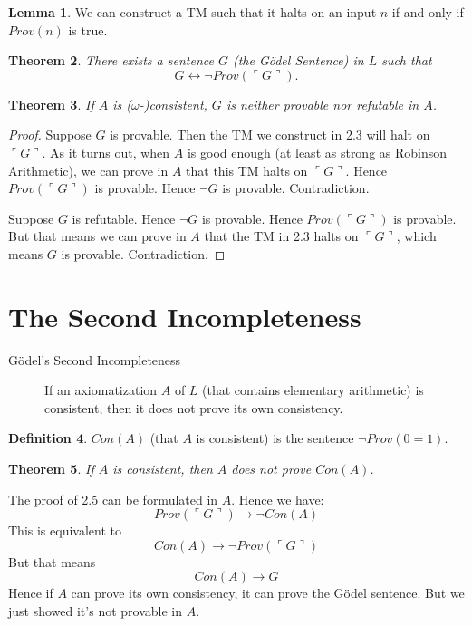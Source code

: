 \documentclass[12pt]{article}
\newtheorem{theo}{Theorem}[section]
\theoremstyle{definition}
\newtheorem{defin}[theo]{Definition}
\newtheorem{lema}[theo]{Lemma}
\newcommand{\proofsketch}{\vspace*{-1ex} \noindent {\bf Proof Sketch: }}
\begin{document}
\begin{lema} 
We can construct a TM such that it halts on an input $n$ if and only if $Prov(n)$ is true.
\end{lema}

\begin{theo}
There exists a sentence $G$ (the G\"{o}del Sentence) in $L$ such that
$$G \leftrightarrow \neg Prov(\ulcorner G \urcorner).$$
\end{theo}

\begin{theo}
If $A$ is ($\omega$-)consistent, $G$ is neither provable nor refutable in $A$.
\end{theo}

\begin{proof} 
Suppose $G$ is provable. Then the TM we construct in 2.3 will halt on $\ulcorner G \urcorner$. As it turns out, when $A$ is good enough (at least as strong as Robinson Arithmetic), we can prove in $A$ that this TM halts on $\ulcorner G \urcorner$. Hence $Prov(\ulcorner G \urcorner)$ is provable. Hence $\neg G$ is provable. Contradiction.

Suppose $G$ is refutable. Hence $\neg G$ is provable. Hence $Prov (\ulcorner G \urcorner)$ is provable. But that means we can prove in $A$ that the TM in 2.3 halts on $\ulcorner G \urcorner$, which means $G$ is provable. Contradiction.
\end{proof}

\section{The Second Incompleteness}

\begin{description}
\item[G\"{o}del's Second Incompleteness] If an axiomatization $A$ of $L$ (that contains elementary arithmetic) is consistent, then it does not prove its own consistency.
\end{description}

\begin{defin}
$Con(A)$ (that $A$ is consistent) is the sentence $\neg Prov(0=1)$.
\end{defin}

\begin{theo}
If $A$ is consistent, then $A$ does not prove $Con(A)$.
\end{theo}

\proofsketch The proof of 2.5 can be formulated in $A$. Hence we have:
$$ Prov(\ulcorner G \urcorner) \rightarrow \neg Con(A)$$
This is equivalent to
$$ Con(A) \rightarrow \neg Prov(\ulcorner G \urcorner)$$
But that means
$$ Con(A) \rightarrow G$$
Hence if $A$ can prove its own consistency, it can prove the G\"{o}del sentence. But we just showed it's not provable in $A$.
\end{document}
